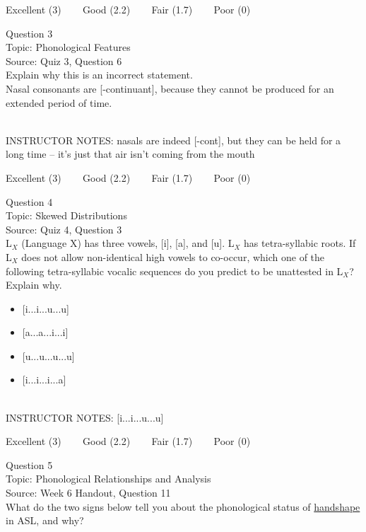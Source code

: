 \documentclass[12pt]{article}
\begin{document}
\vfill
Excellent (3) ~~~ Good (2.2) ~~~ Fair (1.7) ~~~ Poor (0)
\newpage

{\large Question 3}\\

Topic: Phonological Features\\
Source: Quiz 3, Question 6\\

Explain why this is an incorrect statement.\\

Nasal consonants are {[-continuant]}, because they cannot be produced for an extended period of time.


~\\
INSTRUCTOR NOTES: nasals are indeed [-cont], but they can be held for a long time -- it's just that air isn't coming from the mouth


\vfill
Excellent (3) ~~~ Good (2.2) ~~~ Fair (1.7) ~~~ Poor (0)
\newpage

{\large Question 4}\\

Topic: Skewed Distributions\\
Source: Quiz 4, Question 3\\

L$_X$ (Language X) has three vowels, [i], [a], and [u]. L$_X$ has tetra-syllabic roots. If L$_X$ does not allow non-identical high vowels to co-occur, which one of the following tetra-syllabic vocalic sequences do you predict to be unattested in L$_X$? Explain why.\\

\begin{itemize} \item {[i...i...u...u]} \item {[a...a...i...i]} \item {[u...u...u...u]} \item {[i...i...i...a]} \end{itemize}


~\\
INSTRUCTOR NOTES: [i...i...u...u]


\vfill
Excellent (3) ~~~ Good (2.2) ~~~ Fair (1.7) ~~~ Poor (0)
\newpage

{\large Question 5}\\

Topic: Phonological Relationships and Analysis\\
Source: Week 6 Handout, Question 11\\

What do the two signs below tell you about the phonological status of \underline{handshape} in ASL, and why?\\
\end{document}
